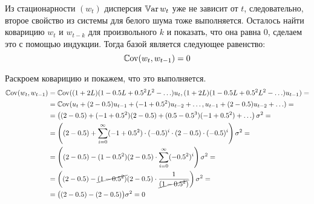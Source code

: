 \begin{problem}
\begin{sol}
\begin{enumerate}
Из стационарности $(w_t)$ дисперсия $\operatorname{\mathbb{V}\mathrm{ar}}{w_t}$ уже не зависит от $t$, следовательно, второе свойство из системы для белого шума тоже выполняется. 
Осталось найти коварицию $w_t$ и $w_{t-k}$ для произвольного $k$ и показать, что она равна 0, сделаем это с помощью индукции. Тогда базой является следующее равенство:
\[
    \operatorname{\mathbb{C}\mathrm{ov}}(w_t, w_{t-1}) = 0
\]

Раскроем коварицию и покажем, что это выполняется.
\begin{align*}
    \operatorname{\mathbb{C}\mathrm{ov}}(w_t, w_{t-1}) &= \operatorname{\mathbb{C}\mathrm{ov}}((1 + 2L) (1 - 0.5L + 0.5^2 L^2 - \ldots)u_t, (1 + 2L) (1 - 0.5L + 0.5^2 L^2 - \ldots)u_{t-1}) = \\
    &= \operatorname{\mathbb{C}\mathrm{ov}}(u_t + (2 - 0.5)u_{t-1} + (-1 +0.5^2)u_{t-2} + \ldots, u_{t-1} + (2 - 0.5)u_{t-2} + \ldots) = \\
    &= \left((2 - 0.5) + (-1 + 0.5^2)(2 - 0.5) + (0.5 - 0.5^3)(-1 + 0.5^2) + \ldots\right) \sigma^2 = \\
    &= \left((2 - 0.5) + \sum_{i = 0}^{\infty}(-1 + 0.5^2)\cdot (-0.5)^i \cdot (2 - 0.5) \cdot (-0.5)^i\right) \sigma^2 = \\
    &= \left((2 - 0.5) - (1 - 0.5^2)(2 - 0.5)\cdot \sum_{i = 0}^{\infty}(-0.5^2)^i\right) \sigma^2 = \\
    &= \left((2 - 0.5) - \cancel{(1 - 0.5^2)}(2 - 0.5)\cdot \frac{1}{\cancel{(1 - 0.5^2)}}\right) \sigma^2 = \\
    &= \big((2 - 0.5) - (2 - 0.5)\big) \sigma^2 = 0 \\
\end{align*}


\end{enumerate}
\end{sol}
\end{problem}
